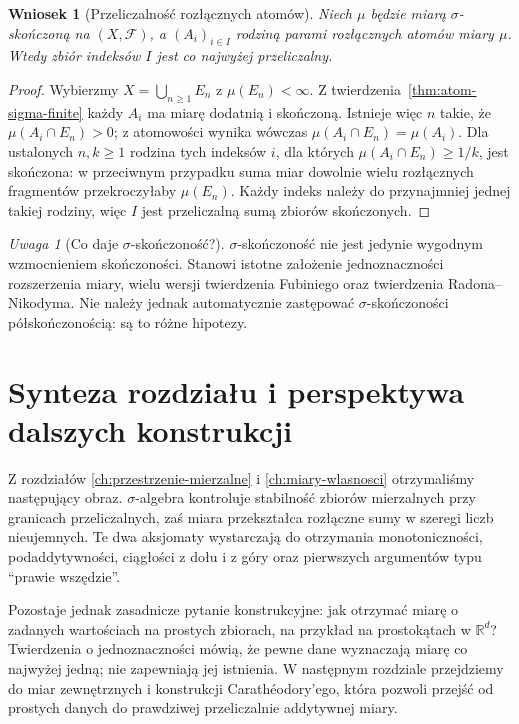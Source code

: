 \documentclass[11pt,a4paper,oneside]{book}
\numberwithin{equation}{chapter}
\theoremstyle{plain}
\newtheorem{wniosek}[twierdzenie]{Wniosek}
\theoremstyle{definition}
\theoremstyle{remark}
\newtheorem{uwaga}[twierdzenie]{Uwaga}
\begin{document}
\begin{wniosek}[Przeliczalność rozłącznych atomów]
\label{cor:countably-many-disjoint-atoms}
Niech $\mu$ będzie miarą $\sigma$-skończoną na
$(X,\mathcal F)$, a $(A_i)_{i\in I}$ rodziną parami rozłącznych
atomów miary $\mu$. Wtedy zbiór indeksów $I$ jest co najwyżej
przeliczalny.
\end{wniosek}
\begin{proof}
Wybierzmy $X=\bigcup_{n\ge1}E_n$ z $\mu(E_n)<\infty$.
Z twierdzenia~\ref{thm:atom-sigma-finite} każdy $A_i$ ma
miarę dodatnią i skończoną. Istnieje więc $n$ takie, że
$\mu(A_i\cap E_n)>0$; z atomowości wynika wówczas
$\mu(A_i\cap E_n)=\mu(A_i)$. Dla ustalonych $n,k\ge1$
rodzina tych indeksów $i$, dla których
$\mu(A_i\cap E_n)\ge1/k$, jest skończona:
w przeciwnym przypadku suma miar dowolnie wielu
rozłącznych fragmentów przekroczyłaby $\mu(E_n)$.
Każdy indeks należy do przynajmniej jednej takiej
rodziny, więc $I$ jest przeliczalną sumą zbiorów
skończonych.
\end{proof}

\begin{uwaga}[Co daje $\sigma$-skończoność?]
$\sigma$-skończoność nie jest jedynie wygodnym
wzmocnieniem skończoności. Stanowi istotne założenie
jednoznaczności rozszerzenia miary, wielu wersji
twierdzenia Fubiniego oraz twierdzenia Radona--Nikodyma.
Nie należy jednak automatycznie zastępować
$\sigma$-skończoności półskończonością: są to różne hipotezy.
\end{uwaga}

\section{Synteza rozdziału i perspektywa dalszych konstrukcji}

Z rozdziałów \ref{ch:przestrzenie-mierzalne} i
\ref{ch:miary-wlasnosci} otrzymaliśmy następujący obraz.
$\sigma$-algebra kontroluje stabilność zbiorów mierzalnych
przy granicach przeliczalnych, zaś miara przekształca
rozłączne sumy w szeregi liczb nieujemnych. Te dwa
aksjomaty wystarczają do otrzymania monotoniczności,
podaddytywności, ciągłości z dołu i z góry oraz pierwszych
argumentów typu ``prawie wszędzie''.

Pozostaje jednak zasadnicze pytanie konstrukcyjne:
jak otrzymać miarę o zadanych wartościach na prostych
zbiorach, na przykład na prostokątach w $\mathbb R^d$?
Twierdzenia o jednoznaczności mówią, że pewne dane
wyznaczają miarę co najwyżej jedną; nie zapewniają
jej istnienia. W następnym rozdziale przejdziemy
do miar zewnętrznych i konstrukcji Carathéodory'ego,
która pozwoli przejść od prostych danych do prawdziwej
przeliczalnie addytywnej miary.
\end{document}
